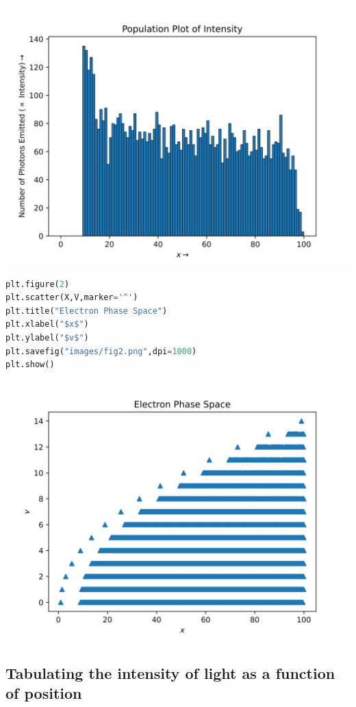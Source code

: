 \documentclass[12pt]{article}
\begin{document}
\begin{center}
    \includegraphics{images/fig1.png}
\end{center}

\pagebreak
\begin{lstlisting}[language=Python]
plt.figure(2)
plt.scatter(X,V,marker='^')
plt.title("Electron Phase Space")
plt.xlabel("$x$")
plt.ylabel("$v$")
plt.savefig("images/fig2.png",dpi=1000)
plt.show()
\end{lstlisting}

\begin{center}
    \includegraphics{images/fig2.png}
\end{center}

\subsection{Tabulating the intensity of light as a function of position}
\end{document}

